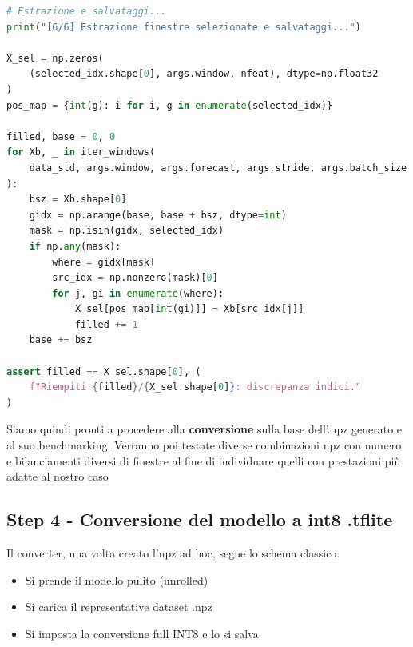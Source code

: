 \begin{lstlisting}[language=Python]
# Estrazione e salvataggi...
print("[6/6] Estrazione finestre selezionate e salvataggi...")

X_sel = np.zeros(
    (selected_idx.shape[0], args.window, nfeat), dtype=np.float32
)
pos_map = {int(g): i for i, g in enumerate(selected_idx)}

filled, base = 0, 0
for Xb, _ in iter_windows(
    data_std, args.window, args.forecast, args.stride, args.batch_size
):
    bsz = Xb.shape[0]
    gidx = np.arange(base, base + bsz, dtype=int)
    mask = np.isin(gidx, selected_idx)
    if np.any(mask):
        where = gidx[mask]
        src_idx = np.nonzero(mask)[0]
        for j, gi in enumerate(where):
            X_sel[pos_map[int(gi)]] = Xb[src_idx[j]]
            filled += 1
    base += bsz

assert filled == X_sel.shape[0], (
    f"Riempiti {filled}/{X_sel.shape[0]}: discrepanza indici."
)
\end{lstlisting}

Siamo quindi pronti a procedere alla \textbf{conversione} sulla base dell'.npz generato e al suo benchmarking. Verranno poi testate diverse combinazioni npz con numero e bilanciamenti diversi di finestre al fine di individuare quelli con prestazioni più adatte al nostro caso

\subsection{Step 4 - Conversione del modello a int8 .tflite}

Il converter, una volta creato l'npz ad hoc, segue lo schema classico:

\begin{itemize}
    \item Si prende il modello pulito (unrolled)
    \item Si carica il representative dataset .npz
    \item Si imposta la conversione full INT8 e lo si salva
\end{itemize}

